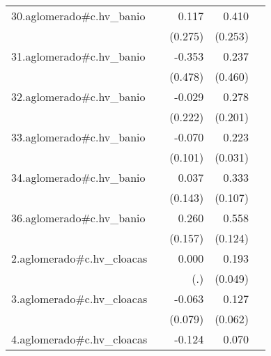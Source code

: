{\begin{longtable}{l*{4}{D{.}{.}{-1}}}
\addlinespace
30.aglomerado#c.hv\_banio&                     &       0.117         &       0.410         &                     \\
            &                     &     (0.275)         &     (0.253)         &                     \\
\addlinespace
31.aglomerado#c.hv\_banio&                     &      -0.353         &       0.237         &                     \\
            &                     &     (0.478)         &     (0.460)         &                     \\
\addlinespace
32.aglomerado#c.hv\_banio&                     &      -0.029         &       0.278         &                     \\
            &                     &     (0.222)         &     (0.201)         &                     \\
\addlinespace
33.aglomerado#c.hv\_banio&                     &      -0.070         &       0.223\sym{***}&                     \\
            &                     &     (0.101)         &     (0.031)         &                     \\
\addlinespace
34.aglomerado#c.hv\_banio&                     &       0.037         &       0.333\sym{**} &                     \\
            &                     &     (0.143)         &     (0.107)         &                     \\
\addlinespace
36.aglomerado#c.hv\_banio&                     &       0.260         &       0.558\sym{***}&                     \\
            &                     &     (0.157)         &     (0.124)         &                     \\
\addlinespace
2.aglomerado#c.hv\_cloacas&                     &       0.000         &       0.193\sym{***}&                     \\
            &                     &         (.)         &     (0.049)         &                     \\
\addlinespace
3.aglomerado#c.hv\_cloacas&                     &      -0.063         &       0.127\sym{*}  &                     \\
            &                     &     (0.079)         &     (0.062)         &                     \\
\addlinespace
4.aglomerado#c.hv\_cloacas&                     &      -0.124\sym{*}  &       0.070\sym{*}  &                     \\

\end{longtable}}
